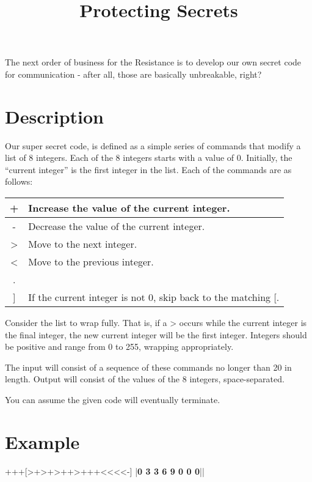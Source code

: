 \documentclass{../codeproblem}
\begin{document}
\title{Protecting Secrets}

\begin{flavor}
  The next order of business for the Resistance is to develop our own secret code for communication - after all, those are basically unbreakable, right?
\end{flavor}

\section*{Description}
Our super secret code, is defined as a simple series of commands that modify a list of 8 integers. Each of the 8 integers starts with a value of 0. Initially, the ``current integer'' is the first integer in the list.  Each of the commands are as follows:

\begin{center}
\begin{tabular}{| c | l |}\hline
  + & Increase the value of the current integer.\\\hline
  - & Decrease the value of the current integer.\\\hline
  > & Move to the next integer.\\\hline
  < & Move to the previous integer.\\\hline
  [ & If the current integer is 0, skip to after the matching ].\\\hline
  ] & If the current integer is not 0, skip back to the matching [.\\\hline
\end{tabular}
\end{center}

Consider the list to wrap fully. That is, if a > occurs while the current integer is the final integer, the new current integer will be the first integer. Integers should be positive and range from 0 to 255, wrapping appropriately.

The input will consist of a sequence of these commands no longer than 20 in length. Output will consist of the values of the 8 integers, space-separated.

You can assume the given code will eventually terminate.

\section*{Example}
\begin{example}
+++[>+>+>++>+++<<<<-]
|\textbf{0 3 3 6 9 0 0 0}||\end{example}
\end{document}
